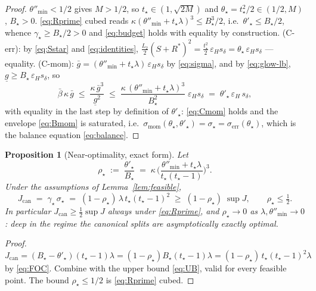 \documentclass[11pt,a4paper]{article}
\theoremstyle{plain}
\newtheorem{proposition}{Proposition}
\theoremstyle{definition}
\newcommand{\eps}{\varepsilon}
\newcommand{\epsH}{\eps_{H}}
\newcommand{\sdel}{s_{\delta}}
\newcommand{\glow}{\underline{g}}
\newcommand{\Rstar}{R^{*}}
\newcommand{\gup}{\bar g}
\newcommand{\bbeta}{\bar\beta}
\newcommand{\serr}{\sigma_{\mathrm{err}}}
\newcommand{\smom}{\sigma_{\mathrm{mom}}}
\newcommand{\tstar}{t_\star}
\newcommand{\thetamin}{\theta''_{\min}}
\begin{document}
\begin{proof}
$\thetamin<1/2$ gives $M>1/2$, so $\tstar\in(1,\sqrt{2M})$ and
$\theta_\star = \tstar^2/2 \in (1/2, M)$, $B_\star>0$.
\eqref{eq:Rprime} cubed reads
$\kappa(\thetamin+\tstar\lambda)^3 \le B_\star^3/2$, i.e.\
$\theta'_\star \le B_\star/2$, whence $\gamma_\star \ge B_\star/2 > 0$ and
\eqref{eq:budget} holds with equality by construction.
(C-err): by \eqref{eq:Sstar} and \eqref{eq:identities},
$\tfrac{L_2}{2}(S+\Rstar)^2 = \tfrac{\tstar^2}{2}\,\epsH\sdel =
\theta_\star\,\epsH\sdel$ --- equality.
(C-mom): $\gup = (\thetamin + \tstar\lambda)\,\epsH\sdel$ by
\eqref{eq:sigma}, and by \eqref{eq:glow-lb},
$\glow \ge B_\star\,\epsH\sdel$, so
\[
\bbeta\,\kappa\,\gup \;\le\; \frac{\kappa\,\gup^3}{\glow^2}
\;\le\; \frac{\kappa\,(\thetamin+\tstar\lambda)^3}{B_\star^2}\;\epsH\sdel
\;=\; \theta'_\star\,\epsH\,\sdel ,
\]
with equality in the last step by definition of $\theta'_\star$:
\eqref{eq:Cmom} holds and the envelope \eqref{eq:Bmom} is saturated, i.e.\
$\smom(\theta_\star,\theta'_\star) = \sigma_\star = \serr(\theta_\star)$,
which is the balance equation \eqref{eq:balance}.
\end{proof}

\begin{proposition}[Near-optimality, exact form]\label{prop:nearopt}
Let
\begin{equation}\label{eq:rho}
\rho_\star \;:=\; \frac{\theta'_\star}{B_\star}
\;=\; \kappa\,\Big(\frac{\thetamin + \tstar\lambda}{\tstar(\tstar-1)}
\Big)^{3} .
\end{equation}
Under the assumptions of Lemma~\ref{lem:feasible},
\begin{equation}\label{eq:nearopt}
J_{\mathrm{can}} \;=\; \gamma_\star\,\sigma_\star
\;=\; (1-\rho_\star)\,\lambda\,\tstar(\tstar-1)^2
\;\ge\; (1-\rho_\star)\;\sup J ,
\qquad \rho_\star \le \tfrac12 .
\end{equation}
In particular $J_{\mathrm{can}} \ge \tfrac12 \sup J$ always under
\eqref{eq:Rprime}, and $\rho_\star \to 0$ as
$\lambda,\thetamin \to 0$: deep in the regime the canonical splits are
asymptotically exactly optimal.
\end{proposition}

\begin{proof}
$J_{\mathrm{can}} = (B_\star - \theta'_\star)(\tstar-1)\lambda =
(1-\rho_\star)B_\star(\tstar-1)\lambda =
(1-\rho_\star)\,\tstar(\tstar-1)^2\lambda$ by \eqref{eq:FOC}. Combine with
the upper bound \eqref{eq:UB}, valid for every feasible point. The bound
$\rho_\star\le 1/2$ is \eqref{eq:Rprime} cubed.
\end{proof}
\end{document}
